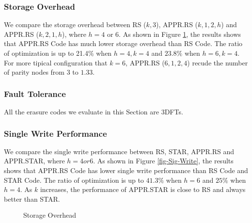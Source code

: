 \documentclass[sigconf]{acmart}
\begin{document}
\subsubsection{Storage Overhead}
We compare the storage overhead between RS ($k,3$), APPR.RS ($k,1,2,h$) and APPR.RS ($k,2,1,h$), where $h = 4$ or $6$.
As shown in Figure \ref{fig-Storage}, the results shows that APPR.RS Code has much lower storage overhead than RS Code. The ratio of optimization is up to 21.4\% when $h=4, k=4$ and $23.8\%$ when $h=6, k=4$. For more tipical configuration that $k=6$, APPR.RS ($6,1,2,4$) recude the number of parity nodes from $3$ to $1.33$.

\subsubsection{Fault Tolerance}
All the erasure codes we evaluate in this Section are 3DFTs.

\subsubsection{Single Write Performance}
We compare the single write performance between RS, STAR, APPR.RS and APPR.STAR, where $h = 4 or 6$. As shown in Figure \ref{fig-Sig-Write}, the results shows that APPR.RS Code has lower single write performance than RS Code and STAR Code. The ratio of optimization is up to $41.3\%$ when $h=6$ and $25\%$ when $h=4$. As $k$ increases, the performance of APPR.STAR is close to RS and always better than STAR.

\begin{figure}[ht]
\caption{Storage Overhead}\label{fig-Storage}
\end{figure}
\end{document}
